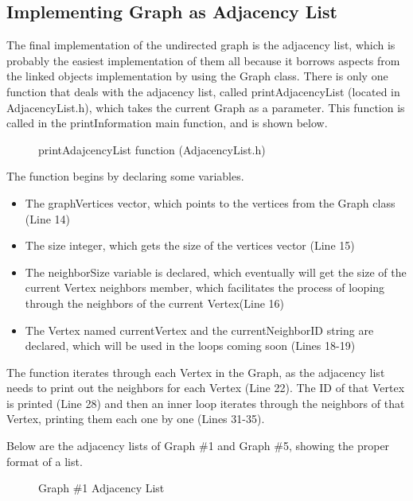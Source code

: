 \documentclass[letterpaper, 10pt]{article}
\begin{document}
\subsection{Implementing Graph as Adjacency List}
\noindent
The final implementation of the undirected graph is the adjacency list, which is probably the easiest implementation of them all because it borrows aspects from the linked objects implementation by using the Graph class. There is only one function that deals with the adjacency list, called printAdjacencyList (located in AdjacencyList.h), which takes the current Graph as a parameter. This function is called in the printInformation main function, and is shown below.

\begin{figure}[H]
  \centering
   
  \caption{printAdajcencyList function (AdjacencyList.h)}
  \label{fig:figure2.24}
\end{figure}

\vspace{-1em}
\noindent
The function begins by declaring some variables.
\begin{itemize}
    \item The graphVertices vector, which points to the vertices from the Graph class (Line 14)
    \item The size integer, which gets the size of the vertices vector (Line 15)
    \item The neighborSize variable is declared, which eventually will get the size of the current Vertex neighbors member, which facilitates the process of looping through the neighbors of the current Vertex(Line 16)
    \item The Vertex named currentVertex and the currentNeighborID string are declared, which will be used in the loops coming soon (Lines 18-19)  
\end{itemize}

\noindent
The function iterates through each Vertex in the Graph, as the adjacency list needs to print out the neighbors for each Vertex (Line 22). The ID of that Vertex is printed (Line 28) and then an inner loop iterates through the neighbors of that Vertex, printing them each one by one (Lines 31-35).

\vspace{1em}
\noindent
Below are the adjacency lists of Graph \#1 and Graph \#5, showing the proper format of a list.

\begin{figure}[H] 
    \centering 
    \caption{Graph \#1 Adjacency List}
    \label{fig:figure2.25}
\end{figure}
\end{document}
